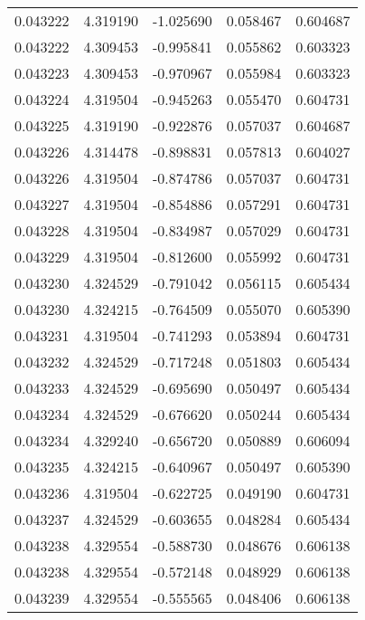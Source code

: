 \begin{tabular}{lrrrr}
0.043222    &  4.319190 & -1.025690 &  0.058467 &             0.604687 \\
0.043222    &  4.309453 & -0.995841 &  0.055862 &             0.603323 \\
0.043223    &  4.309453 & -0.970967 &  0.055984 &             0.603323 \\
0.043224    &  4.319504 & -0.945263 &  0.055470 &             0.604731 \\
0.043225    &  4.319190 & -0.922876 &  0.057037 &             0.604687 \\
0.043226    &  4.314478 & -0.898831 &  0.057813 &             0.604027 \\
0.043226    &  4.319504 & -0.874786 &  0.057037 &             0.604731 \\
0.043227    &  4.319504 & -0.854886 &  0.057291 &             0.604731 \\
0.043228    &  4.319504 & -0.834987 &  0.057029 &             0.604731 \\
0.043229    &  4.319504 & -0.812600 &  0.055992 &             0.604731 \\
0.043230    &  4.324529 & -0.791042 &  0.056115 &             0.605434 \\
0.043230    &  4.324215 & -0.764509 &  0.055070 &             0.605390 \\
0.043231    &  4.319504 & -0.741293 &  0.053894 &             0.604731 \\
0.043232    &  4.324529 & -0.717248 &  0.051803 &             0.605434 \\
0.043233    &  4.324529 & -0.695690 &  0.050497 &             0.605434 \\
0.043234    &  4.324529 & -0.676620 &  0.050244 &             0.605434 \\
0.043234    &  4.329240 & -0.656720 &  0.050889 &             0.606094 \\
0.043235    &  4.324215 & -0.640967 &  0.050497 &             0.605390 \\
0.043236    &  4.319504 & -0.622725 &  0.049190 &             0.604731 \\
0.043237    &  4.324529 & -0.603655 &  0.048284 &             0.605434 \\
0.043238    &  4.329554 & -0.588730 &  0.048676 &             0.606138 \\
0.043238    &  4.329554 & -0.572148 &  0.048929 &             0.606138 \\
0.043239    &  4.329554 & -0.555565 &  0.048406 &             0.606138 \\

\end{tabular}
